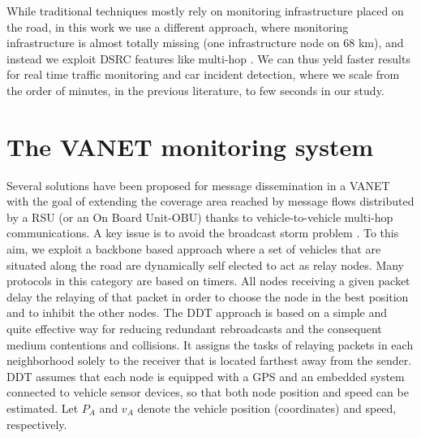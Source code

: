\documentclass[conference]{IEEEtran}
\begin{document}
While traditional techniques mostly rely on monitoring infrastructure placed on the road, in this work we use a different approach, where monitoring infrastructure is almost totally missing (one infrastructure node on 68 km), and instead we exploit DSRC features like multi-hop \cite{DSRCnew}. We can thus yeld faster results for real time traffic monitoring and car incident detection, where we scale from the order of minutes, in the previous literature, to few seconds in our study.






\section{The VANET monitoring system}
\label{sec:monitoring}

Several solutions \cite{Pan12} have been proposed for message dissemination in a VANET with the goal of extending the coverage area reached by message flows distributed by a RSU (or an On Board Unit-OBU) thanks to vehicle-to-vehicle multi-hop communications. A key issue is to avoid the broadcast storm problem \cite{NiT99}. To this aim, we exploit a backbone based approach \cite{ITA13} where a set of vehicles that are situated along the road are dynamically self elected to act as relay nodes. Many protocols in this category are based on timers. All nodes receiving a given packet delay the relaying of that packet in order to choose the node in the best position and to inhibit the other nodes. The DDT \cite{DDT} approach is based on a simple and quite effective way for reducing redundant rebroadcasts and the consequent medium contentions and collisions. It assigns the tasks of relaying packets in each neighborhood solely to the receiver that is located farthest away from the sender. DDT assumes that each node is equipped with a GPS and an embedded system connected to vehicle sensor devices, so that both node position and speed can be estimated. Let $P_A$ and $v_A$ denote the vehicle position (coordinates) and speed, respectively.
\end{document}
